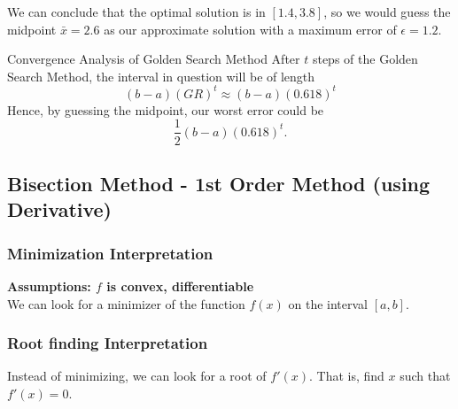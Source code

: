 We can conclude that the optimal solution is in $[1.4,3.8]$, so we would guess the midpoint $\bar x = 2.6$ as our approximate solution with a maximum error of $\epsilon = 1.2$.

\begin{general}{Convergence Analysis of Golden Search Method}{}
After $t$ steps of the Golden Search Method, the interval in question will be of length
$$
(b-a)(GR)^t \approx (b-a)(0.618)^t
$$
Hence, by guessing the midpoint, our worst error could be
$$
\frac{1}{2}(b-a)(0.618)^t.
$$
\end{general}






\subsection{Bisection Method - 1st Order Method (using Derivative)}

\subsubsection{Minimization Interpretation}
\textbf{Assumptions: $f$ is convex, differentiable}\\

We can look for a minimizer of the function $f(x)$ on the interval $[a,b]$.


\subsubsection{Root finding Interpretation}
Instead of minimizing, we can look for a root of $f'(x)$.  That is, find $x$ such that $f'(x) = 0$.  


